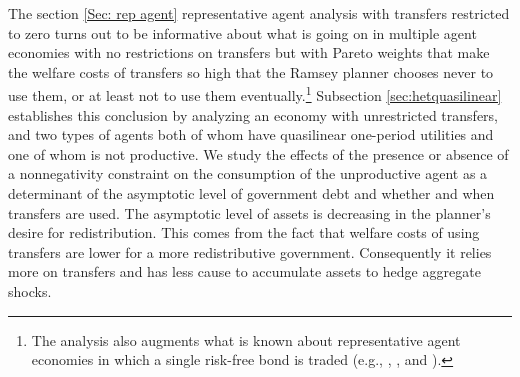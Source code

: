\documentclass[thmsb,11pt]{article}
\begin{document}
 The section   \ref{Sec: rep agent} representative agent analysis with transfers restricted to zero 
  turns out to be   informative about what is going on in multiple agent economies with no restrictions on transfers but with Pareto weights that make
     the welfare  costs of transfers so  high that the Ramsey planner chooses never to use them, or at least not to use them
     eventually.\footnote{The analysis
also  augments what is known about representative agent economies in which a single  risk-free bond is traded (e.g., \citet{Aiyagari2002}, \citet{Farhi2010},
and \citet{Faraglia2011}).}
Subsection \ref{sec:hetquasilinear} establishes this conclusion by analyzing an economy with  unrestricted transfers, and two types of agents both of whom
 have quasilinear one-period utilities and one of whom is not productive. We study the effects of the presence or absence of  a nonnegativity constraint on the consumption of the unproductive agent as a determinant of the asymptotic level of government debt and  whether and when transfers are used. 
The asymptotic level of assets is decreasing in the planner's desire for redistribution.
This comes from the fact that welfare costs of using transfers are lower for a more redistributive government.
Consequently it relies more on transfers and has less cause to accumulate assets to hedge aggregate shocks.



%
%
%
 
\end{document}
